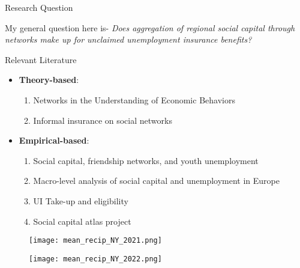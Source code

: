 \documentclass[xcolor=dvipsnames]{beamer} %
\begin{document}
\begin{frame}{}
\begin{columns}[t]
\begin{column}{.3\linewidth}
\begin{block}{\LARGE Research Question}
\begin{itemize}
       My general question here is- \textit{Does aggregation of regional social capital through networks make up for unclaimed unemployment insurance benefits?}
  \end{itemize}
 
\end{block}

\begin{block}{ \LARGE Relevant Literature}
\begin{itemize}
    \vspace{0.3 in}
    \item {\textbf{Theory-based}}: 
    \vspace{0.3 in}
    \begin{enumerate}
        \item Networks in the Understanding of Economic Behaviors\cite{jackson2014networks}
        \item Informal insurance on social networks \cite{bloch2008informal}
        
    \end{enumerate}
    



\vspace{0.3 in}
    \item {\textbf{Empirical-based}}:
\vspace{0.3 in}
    \begin{enumerate}
        \item Social capital, friendship networks, and youth unemployment\cite{hallsten2017social}
        
        \item Macro-level analysis of social capital and unemployment in Europe \cite{freitag2011social}
        
        \item UI Take-up and eligibility  \cite{auray2020eligibility}

        \item  Social capital atlas project  \cite{chetty2022social1}\cite{chetty2022social2}

    \end{enumerate}
    

\end{itemize}

\end{block}


\begin{figure}[h]
\begin{minipage}{0.5\textwidth}
    \centering
    \texttt{[image: mean\_recip\_NY\_2021.png]} %
  \end{minipage}\hfill
  \begin{minipage}{0.5\textwidth}
    \centering
    \texttt{[image: mean\_recip\_NY\_2022.png]} %
  \end{minipage}
\end{figure}


\end{column}
\end{columns}
\end{frame}
\end{document}
